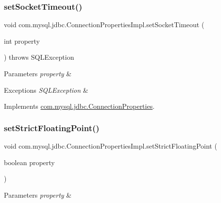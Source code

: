 \subsubsection{\texorpdfstring{set\+Socket\+Timeout()}{setSocketTimeout()}}
{\footnotesize\ttfamily void com.\+mysql.\+jdbc.\+Connection\+Properties\+Impl.\+set\+Socket\+Timeout (\begin{DoxyParamCaption}\item[{int}]{property }\end{DoxyParamCaption}) throws S\+Q\+L\+Exception}


\begin{DoxyParams}{Parameters}
{\em property} & \\
\hline
\end{DoxyParams}

\begin{DoxyExceptions}{Exceptions}
{\em S\+Q\+L\+Exception} & \\
\hline
\end{DoxyExceptions}


Implements \mbox{\hyperlink{interfacecom_1_1mysql_1_1jdbc_1_1_connection_properties_a9c60457be4c5136f4c9a46d849b4a5b9}{com.\+mysql.\+jdbc.\+Connection\+Properties}}.

\mbox{\label{classcom_1_1mysql_1_1jdbc_1_1_connection_properties_impl_a015c113b8264ed8c7e876da6dabdd45d}} 
\subsubsection{\texorpdfstring{set\+Strict\+Floating\+Point()}{setStrictFloatingPoint()}}
{\footnotesize\ttfamily void com.\+mysql.\+jdbc.\+Connection\+Properties\+Impl.\+set\+Strict\+Floating\+Point (\begin{DoxyParamCaption}\item[{boolean}]{property }\end{DoxyParamCaption})}


\begin{DoxyParams}{Parameters}
{\em property} & \\
\hline
\end{DoxyParams}


